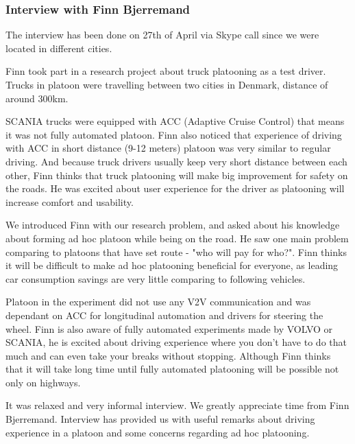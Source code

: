 \subsubsection{Interview with Finn Bjerremand}


The interview has been done on 27th of April via Skype call since we were located in different cities.\par
% 
Finn took part in a research project about truck platooning as a test driver. Trucks in platoon were travelling between two cities in Denmark, distance of around 300km.\par
% 
SCANIA trucks were equipped with ACC (Adaptive Cruise Control) that means it was not fully automated platoon. Finn also noticed that experience of driving with ACC in short distance (9-12 meters) platoon was very similar to regular driving. And because truck drivers usually keep very short distance between each other, Finn thinks that truck platooning will make big improvement for safety on the roads. He was excited about user experience for the driver as platooning will increase comfort and usability.\par
% 
We introduced Finn with our research problem, and asked about his knowledge about forming ad hoc platoon while being on the road. He saw one main problem comparing to platoons that have set route - "who will pay for who?". Finn thinks it will be difficult to make ad hoc platooning beneficial for everyone, as leading car consumption savings are very little comparing to following vehicles.\par
% 
Platoon in the experiment did not use any V2V communication and was dependant on ACC for longitudinal automation and drivers for steering the wheel. Finn is also aware of fully automated experiments made by VOLVO or SCANIA, he is excited about driving experience where you don't have to do that much and can even take your breaks without stopping. Although Finn thinks that it will take long time until fully automated platooning will be possible not only on highways.\par
% 
It was relaxed and very informal interview. We greatly appreciate time from Finn Bjerremand. Interview has provided us with useful remarks about driving experience in a platoon and some concerns regarding ad hoc platooning.